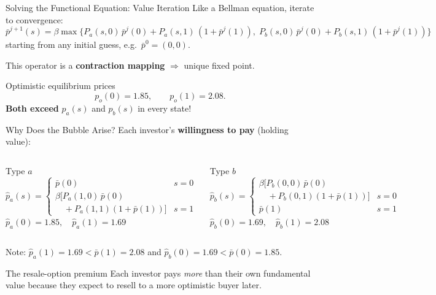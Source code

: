 \documentclass[aspectratio=169]{beamer}
\newcommand{\pbar}{\bar{p}}
\newcommand{\pha}{\hat{p}_a}
\newcommand{\phb}{\hat{p}_b}
\begin{document}
\begin{frame}{Solving the Functional Equation: Value Iteration}
  Like a Bellman equation, iterate to convergence:
  \[
    \pbar^{j+1}(s) = \beta \max\bigl\{
      P_a(s,0)\,\pbar^j(0) + P_a(s,1)\,(1+\pbar^j(1)),\;
      P_b(s,0)\,\pbar^j(0) + P_b(s,1)\,(1+\pbar^j(1))
    \bigr\}
  \]
  starting from any initial guess, e.g.\ $\pbar^0=(0,0)$.

  \medskip
  This operator is a \textbf{contraction mapping} $\Rightarrow$ unique fixed
  point.

  \medskip
  \begin{block}{Optimistic equilibrium prices}
    \[
      p_o(0) = 1.85, \qquad p_o(1) = 2.08.
    \]
    \textbf{Both exceed} $p_a(s)$ and $p_b(s)$ in every state!
  \end{block}
\end{frame}

\begin{frame}{Why Does the Bubble Arise?}
  Each investor's \textbf{willingness to pay} (holding value):

  \begin{columns}
    \begin{block}{Type $a$}
      \[
        \pha(s) = \begin{cases}
          \pbar(0) & s=0 \\[4pt]
          \beta\bigl[P_a(1,0)\,\pbar(0) \\
          \quad + P_a(1,1)(1+\pbar(1))\bigr] & s=1
        \end{cases}
      \]
      $\pha(0)=1.85,\quad \pha(1)=1.69$
    \end{block}

    \begin{block}{Type $b$}
      \[
        \phb(s) = \begin{cases}
          \beta\bigl[P_b(0,0)\,\pbar(0) \\
          \quad + P_b(0,1)(1+\pbar(1))\bigr] & s=0 \\[4pt]
          \pbar(1) & s=1
        \end{cases}
      \]
      $\phb(0)=1.69,\quad \phb(1)=2.08$
    \end{block}

  \end{columns}

  \medskip
  Note: $\pha(1)=1.69 < \pbar(1)=2.08$ and $\phb(0)=1.69 < \pbar(0)=1.85$.

  \begin{alertblock}{The resale-option premium}
    Each investor pays \emph{more} than their own fundamental value because they
    expect to resell to a more optimistic buyer later.
  \end{alertblock}
\end{frame}
\end{document}
